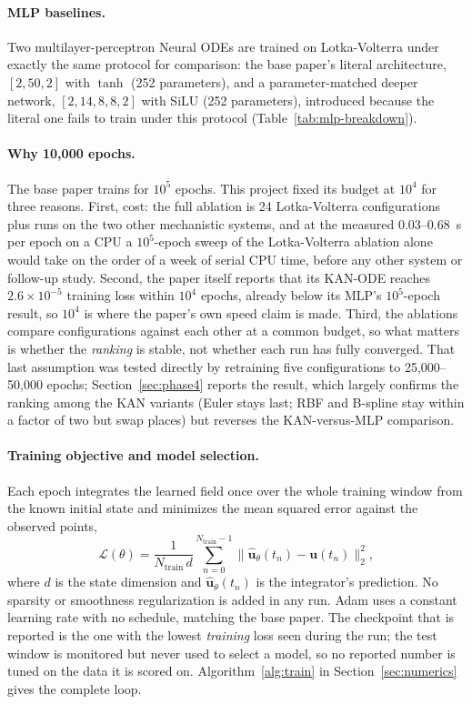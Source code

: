 \paragraph{MLP baselines.} Two multilayer-perceptron Neural ODEs are trained
on Lotka-Volterra under exactly the same protocol for comparison: the base
paper's literal architecture, $[2,50,2]$ with $\tanh$ (252 parameters), and a
parameter-matched deeper network, $[2,14,8,8,2]$ with SiLU (252 parameters),
introduced because the literal one fails to train under this protocol
(Table~\ref{tab:mlp-breakdown}).

\paragraph{Why 10{,}000 epochs.} The base paper trains for $10^5$ epochs.
This project fixed its budget at $10^4$ for three reasons. First, cost: the
full ablation is 24 Lotka-Volterra configurations plus runs on the two other
mechanistic systems, and at the measured $0.03$--$0.68$~s per epoch on a CPU a $10^5$-epoch
sweep of the Lotka-Volterra ablation alone would take on the order of a week
of serial CPU time, before any other system or follow-up study. Second, the paper itself reports that its
KAN-ODE reaches $2.6\times10^{-5}$ training loss within $10^4$ epochs,
already below its MLP's $10^5$-epoch result, so $10^4$ is where the paper's
own speed claim is made. Third, the ablations compare configurations against
each other at a common budget, so what matters is whether the
\emph{ranking} is stable, not whether each run has fully converged. That last
assumption was tested directly by retraining five configurations to
25{,}000--50{,}000 epochs; Section~\ref{sec:phase4} reports the result, which
largely confirms the ranking among the KAN variants (Euler stays last; RBF
and B-spline stay within a factor of two but swap places) but reverses the
KAN-versus-MLP comparison.

\paragraph{Training objective and model selection.} Each epoch integrates the
learned field once over the whole training window from the known initial
state and minimizes the mean squared error against the observed points,
\begin{equation}
\mathcal L(\theta)=\frac{1}{N_{\text{train}}\,d}\sum_{n=0}^{N_{\text{train}}-1}\big\lVert \hat{\mathbf u}_\theta(t_n)-\mathbf u(t_n)\big\rVert_2^2,
\label{eq:train-loss}
\end{equation}
where $d$ is the state dimension and $\hat{\mathbf u}_\theta(t_n)$ is the
integrator's prediction. No sparsity or smoothness regularization is added
in any run. Adam uses a constant learning rate with no schedule, matching the
base paper. The checkpoint that is reported is the one with the lowest
\emph{training} loss seen during the run; the test window is monitored but
never used to select a model, so no reported number is tuned on the data it
is scored on. Algorithm~\ref{alg:train} in Section~\ref{sec:numerics} gives
the complete loop.

\FloatBarrier
